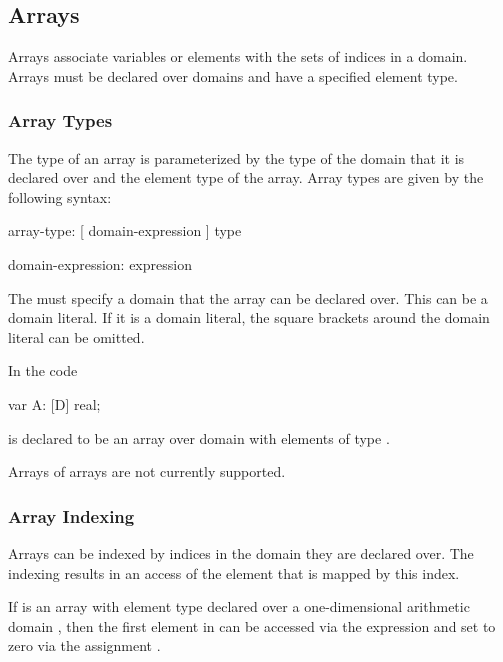 \subsection{Arrays}
\label{Arrays}

Arrays associate variables or elements with the sets of indices in a
domain.  Arrays must be declared over domains and have a specified
element type.

\subsubsection{Array Types}
\label{Array_Types}

The type of an array is parameterized by the type of the domain that
it is declared over and the element type of the array.  Array types
are given by the following syntax:
\begin{syntax}
array-type:
  [ domain-expression ] type

domain-expression:
  expression
\end{syntax}
The  must specify a domain that the array can
be declared over.  This can be a domain literal.  If it is a domain
literal, the square brackets around the domain literal can be omitted.

\begin{example}
In the code
\begin{chapel}
var A: [D] real;
\end{chapel}
 is declared to be an array over domain  with
elements of type .
\end{example}

\begin{implementation}
Arrays of arrays are not currently supported.
\end{implementation}

\subsubsection{Array Indexing}
\label{Array_Indexing}

Arrays can be indexed by indices in the domain they are declared over.
The indexing results in an access of the element that is mapped by
this index.

\begin{example}
If  is an array with element type  declared over a
one-dimensional arithmetic domain \chpl{[1..n]}, then the first
element in  can be accessed via the expression  and
set to zero via the assignment .
\end{example}

